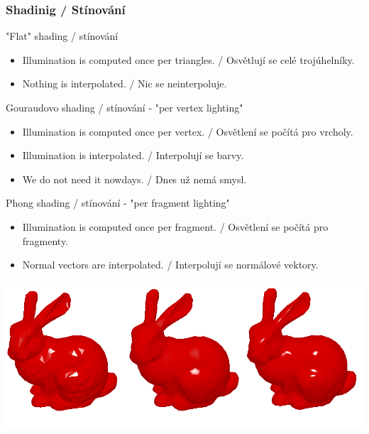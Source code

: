 \begin{frame}\frametitle{Shadinig / Stínování}\scriptsize

    "Flat" shading / stínování
    \begin{itemize}
        \item Illumination is computed once per triangles. / Osvětlují se celé trojúhelníky.
        \item Nothing is interpolated. / Nic se neinterpoluje.
    \end{itemize}

    Gouraudovo shading / stínování - "per vertex lighting"
    \begin{itemize}
        \item Illumination is computed once per vertex. / Osvětlení se počítá pro vrcholy.
        \item Illumination is interpolated. / Interpolují se barvy.
        \item We do not need it nowdays. / Dnes už nemá smysl.
    \end{itemize}

    Phong shading / stínování - "per fragment lighting"
    \begin{itemize}
        \item Illumination is computed once per fragment. / Osvětlení se počítá pro fragmenty.
        \item Normal vectors are interpolated. / Interpolují se normálové vektory.
    \end{itemize}

    \includegraphics[width=\textwidth]{pics/physicallyBasedRendering/shading}
\end{frame}

